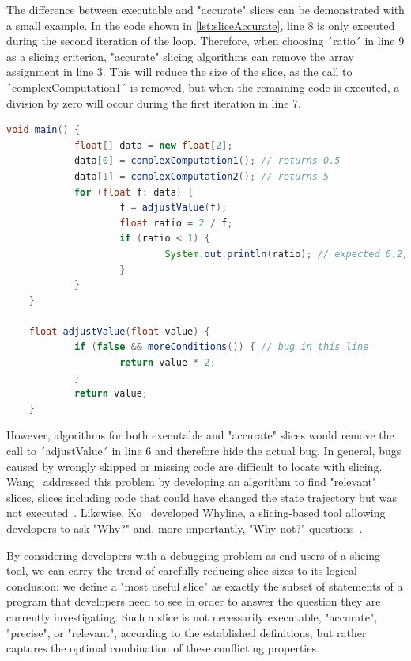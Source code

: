 The difference between executable and "accurate" slices can be demonstrated with a small example.
In the code shown in \cref{lst:sliceAccurate}, line 8 is only executed during the second iteration of the loop.
Therefore, when choosing ´ratio´ in line 9 as a slicing criterion, "accurate" slicing algorithms can remove the array assignment in line 3.
This will reduce the size of the slice, as the call to ´complexComputation1´ is removed, but when the remaining code is executed, a division by zero will occur during the first iteration in line 7.

\begin{lstlisting}[float,caption={Code example for accurate slices.},stepnumber=2,numberfirstline=false,label=lst:sliceAccurate,language=Java]
	void main() {
			float[] data = new float[2];
			data[0] = complexComputation1(); // returns 0.5
			data[1] = complexComputation2(); // returns 5
			for (float f: data) {
					f = adjustValue(f);
					float ratio = 2 / f;
					if (ratio < 1) {
							System.out.println(ratio); // expected 0.2, got 0.4
					}
			}
	}

	float adjustValue(float value) {
			if (false && moreConditions()) { // bug in this line
					return value * 2;
			}
			return value;
	}
\end{lstlisting}

However, algorithms for both executable and "accurate" slices would remove the call to ´adjustValue´ in line 6 and therefore hide the actual bug.
In general, bugs caused by wrongly skipped or missing code are difficult to locate with slicing.
Wang \etal\ addressed this problem by developing an algorithm to find "relevant" slices, slices including code that could have changed the state trajectory but was not executed~\cite{wang_08_dynamic_slicing_on_java}.
Likewise, Ko \etal\ developed Whyline, a slicing-based tool allowing developers to ask "Why?" and, more importantly, "Why not?" questions~\cite{ko_08_debugging_reinvented_asking}.

By considering developers with a debugging problem as end users of a slicing tool, we can carry the trend of carefully reducing slice sizes to its logical conclusion: we define a "most useful slice" as exactly the subset of statements of a program that developers need to see in order to answer the question they are currently investigating.
Such a slice is not necessarily executable, "accurate", "precise", or "relevant", according to the established definitions, but rather captures the optimal combination of these conflicting properties.

